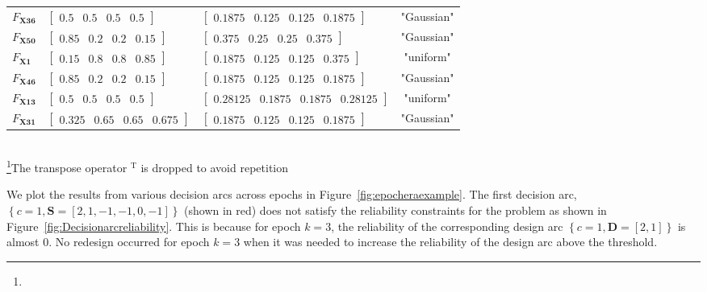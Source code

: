 \begin{table}[h!]
\begin{tabular}{l>{\centering\arraybackslash}p{4.2cm}>{\centering\arraybackslash}p{6cm}c}
	\hline
	$F_{\mathbf{X36}}$ & $\begin{bmatrix} 0.5 & 0.5 & 0.5 & 0.5 \end{bmatrix}$ & $\begin{bmatrix} 0.1875 & 0.125 & 0.125 & 0.1875 \end{bmatrix}$ & "Gaussian" \\
	$F_{\mathbf{X50}}$ & $\begin{bmatrix} 0.85 & 0.2 & 0.2 & 0.15 \end{bmatrix}$ & $\begin{bmatrix} 0.375 & 0.25 & 0.25 & 0.375 \end{bmatrix}$ & "Gaussian" \\
	$F_{\mathbf{X1}}$ & $\begin{bmatrix} 0.15 & 0.8 & 0.8 & 0.85 \end{bmatrix}$ & $\begin{bmatrix} 0.1875 & 0.125 & 0.125 & 0.375 \end{bmatrix}$ & "uniform" \\
	$F_{\mathbf{X46}}$ & $\begin{bmatrix} 0.85 & 0.2 & 0.2 & 0.15 \end{bmatrix}$ & $\begin{bmatrix} 0.1875 & 0.125 & 0.125 & 0.1875 \end{bmatrix}$ & "Gaussian" \\
	$F_{\mathbf{X13}}$ & $\begin{bmatrix} 0.5 & 0.5 & 0.5 & 0.5 \end{bmatrix}$ & $\begin{bmatrix} 0.28125 & 0.1875 & 0.1875 & 0.28125 \end{bmatrix}$ & "uniform" \\
	$F_{\mathbf{X31}}$ & $\begin{bmatrix} 0.325 & 0.65 & 0.65 & 0.675 \end{bmatrix}$ & $\begin{bmatrix} 0.1875 & 0.125 & 0.125 & 0.1875 \end{bmatrix}$ & "Gaussian" \\
	\hline\hline
	\end{tabular}\\
	\footnote[1]{}The transpose operator $^{\mathrm{T}}$ is dropped to avoid repetition
\end{table}

We plot the results from various decision arcs across epochs in Figure~\ref{fig:epocheraexample}. The first decision arc, $\left\{c=1,\mathbf{S}=\left[2,1,-1,-1,0,-1\right]\right\}$ (shown in red) does not satisfy the reliability constraints for the problem as shown in Figure~\ref{fig:Decisionarcreliability}. This is because for epoch $k=3$, the reliability of the corresponding design arc $\left\{c=1,\mathbf{D}=\left[2,1\right]\right\}$ is almost 0. No redesign occurred for epoch $k=3$ when it was needed to increase the reliability of the design arc above the threshold.

